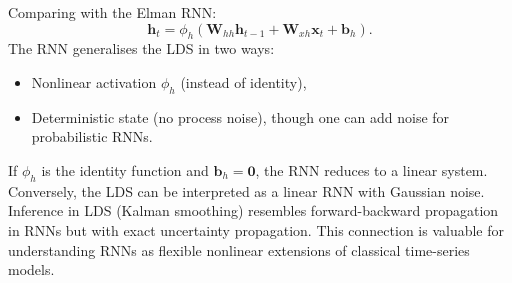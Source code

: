 \documentclass{tufte-handout}
\begin{document}
Comparing with the Elman RNN:
\[
\mathbf{h}_t = \phi_h(\mathbf{W}_{hh}\mathbf{h}_{t-1} + \mathbf{W}_{xh}\mathbf{x}_t + \mathbf{b}_h).
\]
The RNN generalises the LDS in two ways:
\begin{itemize}
    \item Nonlinear activation $\phi_h$ (instead of identity),
    \item Deterministic state (no process noise), though one can add noise for probabilistic RNNs.
\end{itemize}

If $\phi_h$ is the identity function and $\mathbf{b}_h = \mathbf{0}$, the RNN reduces to a linear system. Conversely, the LDS can be interpreted as a linear RNN with Gaussian noise. Inference in LDS (Kalman smoothing) resembles forward-backward propagation in RNNs but with exact uncertainty propagation. This connection is valuable for understanding RNNs as flexible nonlinear extensions of classical time-series models.

\begin{marginfigure}
\centering
\caption{RNNs generalise linear dynamical systems by replacing linear transitions with nonlinear functions.}
\label{fig:rnn_vs_lds}
\end{marginfigure}
\end{document}

